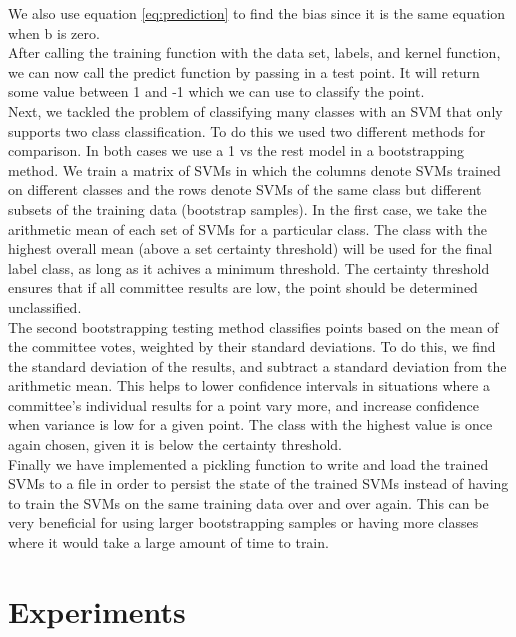 \documentclass[journal]{IEEEtran}
\begin{document}
    We also use equation \ref{eq:prediction} to find the bias since it is the same equation when b is zero.\\

    After calling the training function with the data set, labels, and kernel function, we can now call the predict function by passing in a test point.  It will return some value between 1 and -1 which we can use to classify the point.\\

    Next, we tackled the problem of classifying many classes with an SVM that only supports two class classification. To do this we used two different methods for comparison. In both cases we use a 1 vs the rest model in a bootstrapping method. We train a matrix of SVMs in which the columns denote SVMs trained on different classes and the rows denote SVMs of the same class but different subsets of the training data (bootstrap samples). In the first case, we take the arithmetic mean of each set of SVMs for a particular class. The class with the highest overall mean (above a set certainty threshold) will be used for the final label class, as long as it achives a minimum threshold. The certainty threshold ensures that if all committee results are low, the point should be determined unclassified.\\

    The second bootstrapping testing method classifies points based on the mean of the committee votes, weighted by their standard deviations. To do this, we find the standard deviation of the results, and subtract a standard deviation from the arithmetic mean. This helps to lower confidence intervals in situations where a committee’s individual results for a point vary more, and increase confidence when variance is low for a given point. The class with the highest value is once again chosen, given it is below the certainty threshold. \\

    Finally we have implemented a pickling function to write and load the trained SVMs to a file in order to persist the state of the trained SVMs instead of having to train the SVMs on the same training data over and over again. This can be very beneficial for using larger bootstrapping samples or having more classes where it would take a large amount of time to train.\\




\section{Experiments}
\end{document}

